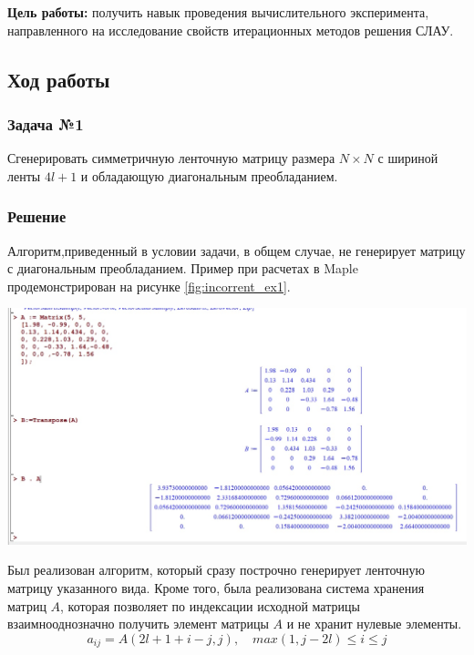 \documentclass[a4paper, fontsize=14pt]{article}
\begin{document}

\textbf{Цель работы:}  получить навык проведения вычислительного
эксперимента, направленного на исследование свойств итерационных методов
решения СЛАУ.
\subsection*{{Ход работы}}
\subsubsection*{Задача №1}
Сгенерировать симметричную ленточную матрицу размера $N \times N$ с шириной ленты $4l + 1$ и обладающую диагональным преобладанием.
\subsubsection*{Решение}

Алгоритм,приведенный в условии задачи, в общем случае, не генерирует матрицу с диагональным преобладанием. Пример при расчетах в Maple продемонстрирован на рисунке \ref{fig:incorrent_ex1}.
\begin{center}
    \includegraphics[scale=0.5]{src/incorrent_ex1.png}
    \label{fig:incorrent_ex1}
\end{center}

Был реализован алгоритм, который сразу построчно генерирует ленточную матрицу указанного вида. Кроме того, была реализована система хранения матриц $A$, 
которая позволяет по индексации исходной матрицы взаимнооднозначно получить элемент матрицы $A$ и не хранит нулевые элементы.
\begin{equation*}
    a_{ij} = A(2l + 1 + i - j , j), \quad max(1, j - 2l) \leq i \leq j
\end{equation*}
\end{document}
